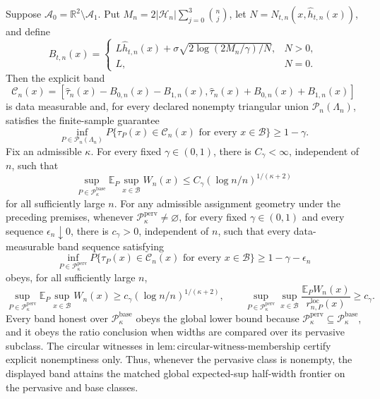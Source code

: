 Suppose \(\mathcal A_0=\mathbb R^2\setminus\mathcal A_1\). Put \(M_n=2|\mathcal H_n|\sum_{j=0}^3\binom nj\), let \(N=N_{t,n}(x,\widehat h_{t,n}(x))\), and define
\[
 B_{t,n}(x)=
 \begin{cases}
 L\widehat h_{t,n}(x)+\sigma\sqrt{2\log(2M_n/\gamma)/N},&N>0,\\
 L,&N=0.
 \end{cases}
\]
Then the explicit band
\[
 \mathcal C_n(x)=
 \left[\widehat\tau_n(x)-B_{0,n}(x)-B_{1,n}(x),
 \widehat\tau_n(x)+B_{0,n}(x)+B_{1,n}(x)\right]
\]
is data measurable and, for every declared nonempty triangular union \(\mathcal P_n(\Lambda_n)\), satisfies the finite-sample guarantee
\[
 \inf_{P\in\mathcal P_n(\Lambda_n)}P\{\tau_P(x)\in\mathcal C_n(x)\text{ for every }x\in\mathcal B\}\ge1-\gamma.
\]
Fix an admissible \(\kappa\).  For every fixed \(\gamma\in(0,1)\), there is \(C_\gamma<\infty\), independent of \(n\), such that
\[
 \sup_{P\in\mathcal P_{\kappa}^{\mathrm{base}}}
 \mathbb E_P\sup_{x\in\mathcal B}W_n(x)
 \le C_\gamma(\log n/n)^{1/(\kappa+2)}
\]
for all sufficiently large \(n\). For any admissible assignment geometry under the preceding premises, whenever \(\mathcal P_{\kappa}^{\mathrm{perv}}\ne\varnothing\), for every fixed \(\gamma\in(0,1)\) and every sequence \(\epsilon_n\downarrow0\), there is \(c_\gamma>0\), independent of \(n\), such that every data-measurable band sequence satisfying
\[
 \inf_{P\in\mathcal P_{\kappa}^{\mathrm{perv}}}
 P\{\tau_P(x)\in\mathcal C_n(x)\text{ for every }x\in\mathcal B\}
 \ge1-\gamma-\epsilon_n
\]
obeys, for all sufficiently large \(n\),
\[
 \sup_{P\in\mathcal P_{\kappa}^{\mathrm{perv}}}
 \mathbb E_P\sup_{x\in\mathcal B}W_n(x)
 \ge c_\gamma(\log n/n)^{1/(\kappa+2)},
 \qquad
 \sup_{P\in\mathcal P_{\kappa}^{\mathrm{perv}}}\sup_{x\in\mathcal B}
 \frac{\mathbb E_PW_n(x)}{r_{n,P}^{\mathrm{loc}}(x)}
 \ge c_\gamma.
\]
Every band honest over \(\mathcal P_{\kappa}^{\mathrm{base}}\) obeys the global lower bound because \(\mathcal P_{\kappa}^{\mathrm{perv}}\subseteq\mathcal P_{\kappa}^{\mathrm{base}}\), and it obeys the ratio conclusion when widths are compared over its pervasive subclass. The circular witnesses in \(\mathrm{lem:circular\text{-}witness\text{-}membership}\) certify explicit nonemptiness only. Thus, whenever the pervasive class is nonempty, the displayed band attains the matched global expected-sup half-width frontier on the pervasive and base classes.

